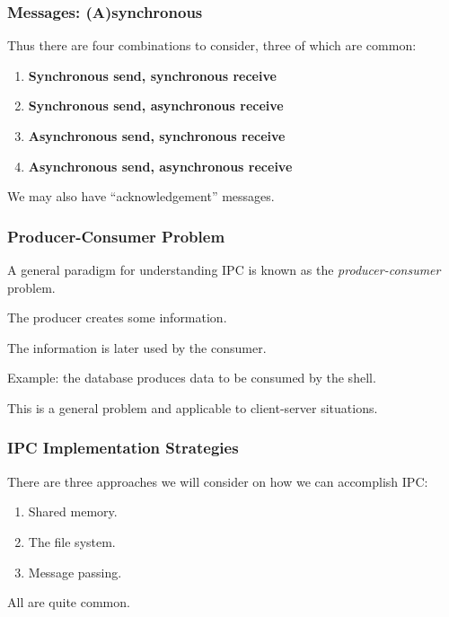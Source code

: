 \begin{frame}
\frametitle{Messages: (A)synchronous}

Thus there are four combinations to consider, three of which are common:

\begin{enumerate}
	\item \textbf{Synchronous send, synchronous receive} 
	\item \textbf{Synchronous send, asynchronous receive}
	\item \textbf{Asynchronous send, synchronous receive}
	\item \textbf{Asynchronous send, asynchronous receive}
\end{enumerate}

We may also have ``acknowledgement'' messages.

\end{frame}

\begin{frame}
\frametitle{Producer-Consumer Problem}

A general paradigm for understanding IPC is known as the \textit{producer-consumer} problem. 

The \alert{producer} creates some information.

The information is later used by the \alert{consumer}. 

Example: the database produces data to be consumed by the shell. 

This is a general problem and applicable to client-server situations.

\end{frame}

\begin{frame}
\frametitle{IPC Implementation Strategies}

There are three approaches we will consider on how we can accomplish IPC:
\begin{enumerate}
	\item Shared memory.
	\item The file system.
	\item Message passing.
\end{enumerate}

All are quite common.

\end{frame}


